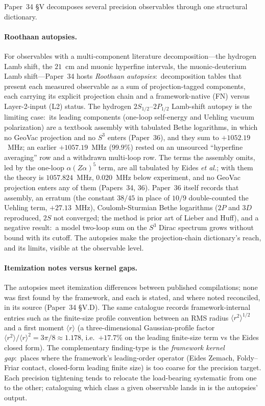 \documentclass[aps,pra,twocolumn,superscriptaddress,longbibliography,nofootinbib]{revtex4-2}
\begin{document}
Paper~34 \S V decomposes several precision observables through one
structural dictionary.

\paragraph{Roothaan autopsies.}
For observables with a multi-component literature decomposition---the
hydrogen Lamb shift, the $21$~cm and muonic hyperfine intervals, the
muonic-deuterium Lamb shift---Paper~34 hosts \emph{Roothaan autopsies}:\
decomposition tables that present each measured observable as a sum of
projection-tagged components, each carrying its explicit projection
chain and a framework-native (FN) versus Layer-2-input (L2) status.  The
hydrogen $2S_{1/2}$--$2P_{1/2}$ Lamb-shift autopsy is the limiting
case:\ its leading components (one-loop self-energy and Uehling
vacuum polarization) are a textbook assembly with tabulated Bethe
logarithms, in which no GeoVac projection and no $S^3$ enters (Paper~36),
and they sum to $+1052.19$~MHz; an earlier
$+1057.19$~MHz ($99.9\%$) rested on an unsourced ``hyperfine averaging''
row and a withdrawn multi-loop row.  The terms the assembly omits, led
by the one-loop $\alpha(Z\alpha)^5$ term, are all tabulated by Eides
\emph{et al.}; with them the theory is $1057.824$~MHz, $0.020$~MHz below
experiment, and no GeoVac projection enters any of them (Papers~34,
36).  Paper~36 itself records that assembly, an erratum (the constant
$38/45$ in place of $10/9$ double-counted the Uehling term, $+27.13$~MHz),
Coulomb-Sturmian Bethe logarithms ($2P$ and $3D$ reproduced, $2S$ not
converged; the method is prior art of Lieber and Huff), and a negative
result:\ a model two-loop sum on the $S^3$ Dirac spectrum grows without
bound with its cutoff.  The autopsies make the projection-chain
dictionary's reach, and its limits, visible at the observable level.

\paragraph{Itemization notes versus kernel gaps.}
The autopsies meet itemization differences between published
compilations; none was first found by the framework, and each is stated,
and where noted reconciled, in its source (Paper~34 \S V.D).  The same
catalogue records framework-internal entries such as the finite-size
profile convention between an RMS radius $\langle r^2\rangle^{1/2}$ and a
first moment $\langle r\rangle$ (a three-dimensional Gaussian-profile
factor $\langle r^2\rangle/\langle r\rangle^2=3\pi/8 \approx 1.178$,
i.e.\ $+17.7\%$ on the leading finite-size term vs the Eides closed form).
The complementary finding-type is the \emph{framework kernel gap}:\
places where the framework's leading-order operator (Eides Zemach,
Foldy--Friar contact, closed-form leading finite size) is too coarse for the precision
target.  Each precision tightening tends to relocate the load-bearing
systematic from one to the other; cataloguing which class a given
observable lands in is the autopsies' output.
\end{document}
